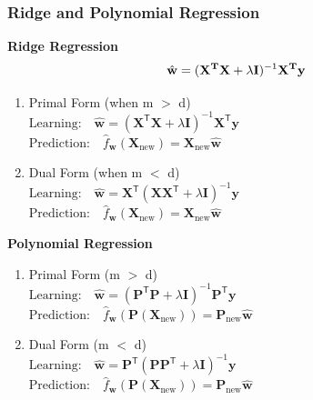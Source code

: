 \subsubsection{Ridge and Polynomial Regression}
\textbf{Ridge Regression}
\begin{equation}
    \Hat{\mathbf{w}} = (\mathbf{X^TX}+\lambda \mathbf{I})^{-1}\mathbf{X^Ty}
\end{equation}
\begin{enumerate}
    \item Primal Form (when m $>$ d)\\
    \(\text{Learning:} \quad \hat{\mathbf{w}} = (\mathbf{X}^\mathsf{T}\mathbf{X} + \lambda \mathbf{I})^{-1} \mathbf{X}^\mathsf{T}\mathbf{y}\) \\
    \(\text{Prediction:} \quad \hat{f}_\mathbf{w}(\mathbf{X}_\text{new}) = \mathbf{X}_\text{new} \hat{\mathbf{w}}\)
    \item Dual Form (when m $<$ d) \\
    \(\text{Learning:} \quad \hat{\mathbf{w}} = \mathbf{X}^\mathsf{T}(\mathbf{X}\mathbf{X}^\mathsf{T} + \lambda \mathbf{I})^{-1} \mathbf{y}\)\\
    \(\text{Prediction:} \quad \hat{f}_\mathbf{w}(\mathbf{X}_\text{new}) = \mathbf{X}_\text{new} \hat{\mathbf{w}}\)
\end{enumerate}
\textbf{Polynomial Regression}
\begin{enumerate}
    \item Primal Form (m $>$ d) \\
    \(\text{Learning:} \quad \hat{\mathbf{w}} = (\mathbf{P}^\mathsf{T}\mathbf{P} + \lambda \mathbf{I})^{-1} \mathbf{P}^\mathsf{T}\mathbf{y}\) \\
    \(\text{Prediction:} \quad \hat{f}_\mathbf{w}(\mathbf{P}(\mathbf{X}_\text{new})) = \mathbf{P}_\text{new} \hat{\mathbf{w}}\)
    \item Dual Form (m $<$ d)\\
    \(\text{Learning:} \quad \hat{\mathbf{w}} = \mathbf{P}^\mathsf{T}(\mathbf{P}\mathbf{P}^\mathsf{T} + \lambda \mathbf{I})^{-1} \mathbf{y}\)\\
    \(\text{Prediction:} \quad \hat{f}_\mathbf{w}(\mathbf{P}(\mathbf{X}_\text{new})) = \mathbf{P}_\text{new} \hat{\mathbf{w}}\)
\end{enumerate}
\newpage
